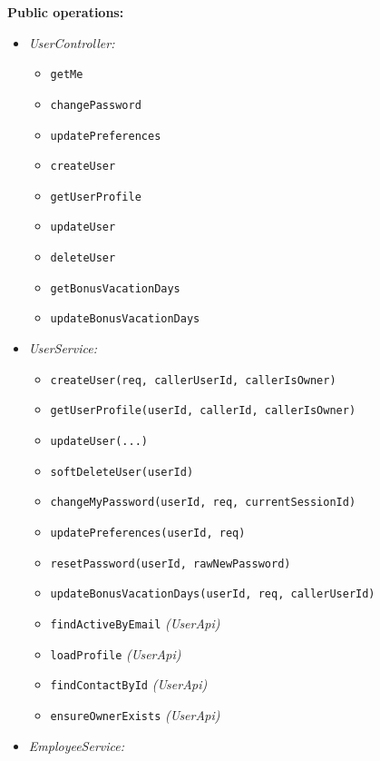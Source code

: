 \documentclass[11pt,a4paper]{article}
\begin{document}
\textbf{Public operations:}
\begin{itemize}[leftmargin=1.5em]
    \item \textit{UserController:}
    \begin{itemize}[noitemsep, leftmargin=1.5em]
        \item \texttt{getMe}
        \item \texttt{changePassword}
        \item \texttt{updatePreferences}
        \item \texttt{createUser}
        \item \texttt{getUserProfile}
        \item \texttt{updateUser}
        \item \texttt{deleteUser}
        \item \texttt{getBonusVacationDays}
        \item \texttt{updateBonusVacationDays}
    \end{itemize}
    \item \textit{UserService:}
    \begin{itemize}[noitemsep, leftmargin=1.5em]
        \item \texttt{createUser(req, callerUserId, callerIsOwner)}
        \item \texttt{getUserProfile(userId, callerId, callerIsOwner)}
        \item \texttt{updateUser(...)}
        \item \texttt{softDeleteUser(userId)}
        \item \texttt{changeMyPassword(userId, req, currentSessionId)}
        \item \texttt{updatePreferences(userId, req)}
        \item \texttt{resetPassword(userId, rawNewPassword)}
        \item \texttt{updateBonusVacationDays(userId, req, callerUserId)}
        \item \texttt{findActiveByEmail} \textit{(UserApi)}
        \item \texttt{loadProfile} \textit{(UserApi)}
        \item \texttt{findContactById} \textit{(UserApi)}
        \item \texttt{ensureOwnerExists} \textit{(UserApi)}
    \end{itemize}
    \item \textit{EmployeeService:}
    \begin{itemize}[noitemsep, leftmargin=1.5em]

\end{itemize}
\end{itemize}
\end{document}
